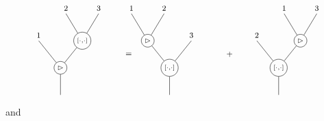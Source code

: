 \documentclass[10pt]{article}
\theoremstyle{definition}
\newcommand{\wt}{\vartriangleright}
\begin{document}
\[
\footnotesize
\begin{tikzpicture}[scale=1]

\node[circle,draw,inner sep=2pt] (w) at (0,0) {$\wt$};

\node[circle,draw,inner sep=2pt] (b) at (0.8,1) {$\scriptstyle[\cdot,\cdot]$};

\draw (w) -- (0,-1);
\draw (-0.8,1) -- (w);
\draw (b) -- (w);
\draw (0.2,2) -- (b);
\draw (1.4,2) -- (b);

\node at (-0.8,1.2) {$1$};
\node at (0.2,2.2) {$2$};
\node at (1.4,2.2) {$3$};

\node at (2.5,0.5) {$=$};


\begin{scope}[shift={(4,0)}]

\node[circle,draw,inner sep=2pt] (b1) at (0,0) {$\scriptstyle[\cdot,\cdot]$};

\node[circle,draw,inner sep=2pt] (w1) at (-0.8,1) {$\wt$};

\draw (b1) -- (0,-1);
\draw (w1) -- (b1);
\draw (0.8,1) -- (b1);

\draw (-1.4,2) -- (w1);
\draw (-0.2,2) -- (w1);

\node at (-1.4,2.2) {$1$};
\node at (-0.2,2.2) {$2$};
\node at (0.8,1.2) {$3$};

\end{scope}

\node at (6.2,0.5) {$+$};

\begin{scope}[shift={(8,0)}]

\node[circle,draw,inner sep=2pt] (b2) at (0,0) {$\scriptstyle[\cdot,\cdot]$};

\node[circle,draw,inner sep=2pt] (w2) at (0.8,1) {$\wt$};

\draw (b2) -- (0,-1);
\draw (-0.8,1) -- (b2);
\draw (w2) -- (b2);

\draw (0.2,2) -- (w2);
\draw (1.4,2) -- (w2);

\node at (-0.8,1.2) {$2$};
\node at (0.2,2.2) {$1$};
\node at (1.4,2.2) {$3$};

\end{scope}

\end{tikzpicture}
\]
and 
\end{document}
